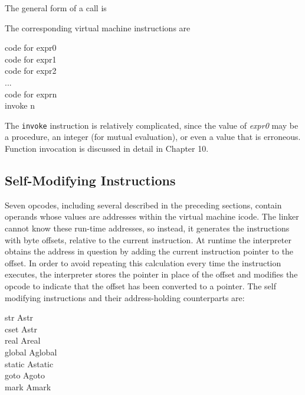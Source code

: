 
The general form of a call is

The corresponding virtual machine instructions are

\begin{iconcode}
\>code for expr0\\
\>code for expr1\\
\>code for expr2\\
\>\>...\\
\>code for exprn\\
\>invoke n
\end{iconcode}

The \texttt{invoke} instruction is relatively complicated, since the
value of \textit{expr0 }may be a procedure, an integer (for mutual
evaluation), or even a value that is erroneous. Function invocation is
discussed in detail in Chapter 10.

\subsection{Self-Modifying Instructions}
\label{Self-Modifying-Ops}
Seven opcodes, including several described in the preceding
sections, contain operands whose values are addresses within the
virtual machine icode. The linker cannot know these run-time
addresses, so instead, it generates the instructions with byte
offsets, relative to the current instruction.  At runtime the
interpreter obtains the address in question by adding the current
instruction pointer to the offset.  In order to avoid repeating this
calculation every time the instruction executes, the interpreter
stores the pointer in place of the offset and modifies the opcode to
indicate that the offset has been converted to a pointer.  The self
modifying instructions and their address-holding counterparts are:

\begin{iconcode}
\>   str    \>\>\>\> Astr \\
\>   cset   \>\>\>\> Astr\\
\>   real   \>\>\>\> Areal\\
\>   global \>\>\>\> Aglobal \\
\>   static \>\>\>\> Astatic\\
\>   goto   \>\>\>\> Agoto\\
\>   mark   \>\>\>\> Amark
\end{iconcode}

